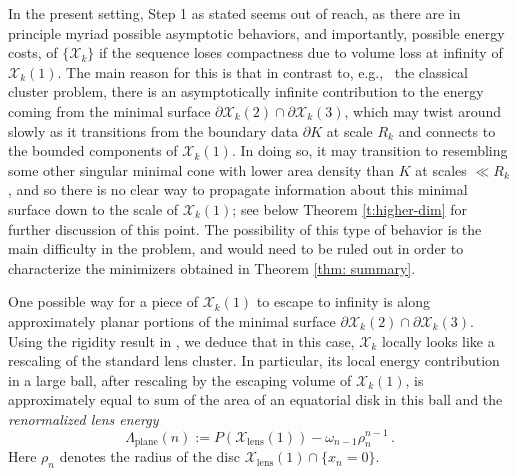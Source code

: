 \documentclass[10pt,reqno]{amsart}
\numberwithin{equation}{section}
\theoremstyle{definition}
\DeclareMathOperator{\lens}{lens}
\DeclareMathOperator{\plane}{plane}
\newcommand{\X}{\mathcal{X}}
\begin{document}
In the present setting, Step 1 as stated seems out of reach, as there are in principle myriad possible asymptotic behaviors, and importantly, possible energy costs, of $\{\X_k\}$ if the sequence loses compactness {due to volume loss at infinity of $\X_k(1)$}. {The main reason for this is that in contrast to, e.g.,~ the classical cluster problem, there is an asymptotically infinite contribution to the energy coming from the minimal surface $\partial \X_k(2) \cap \partial \X_k(3)$, which may twist around slowly as it transitions from the boundary data $\partial K$ at scale $R_k$ and connects to the bounded components of $\X_k(1)$. In doing so, it may transition to resembling some other singular minimal cone with lower area density than $K$ at scales $\ll R_k$, and so there is no clear way to propagate information about this minimal surface down to the scale of $\X_k(1)$; see below Theorem \ref{t:higher-dim} for further discussion of this point. The possibility of this type of behavior is the main difficulty in the problem, and would need to be ruled out in order to characterize the minimizers obtained in Theorem \ref{thm: summary}.}
\medskip


One possible way for a piece of  $\X_k(1)$ to escape to infinity is along approximately planar portions of the minimal surface $\partial \X_k(2) \cap \partial \X_{k}(3)$. Using the rigidity result in \cite{BroNov24}, we deduce that in this case, $\X_k$ locally looks like a rescaling of the standard lens cluster. In particular, its local energy contribution in a large ball, after rescaling by the escaping volume of $\X_k(1)$, is approximately equal to sum of the area of an equatorial disk in this ball and the {\it renormalized lens energy}
\begin{equation}\label{eqn: Lambda plane def}
    \Lambda_{\plane}(n) := P(\X_{\lens}(1)) -\omega_{n-1}\rho_n^{n-1}\,. %
\end{equation}
Here $\rho_n$ denotes the radius of the disc $\X_{\lens}(1) \cap \{x_n=0\}$.

\medskip
\end{document}
